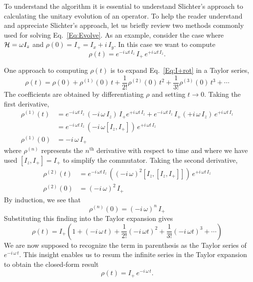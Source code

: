 To understand the  algorithm it is essential to understand Slichter's approach to calculating the unitary evolution of an operator.  To help the reader understand and appreciate Slichter's approach, let us briefly review two methods commonly used for solving Eq.~\ref{Eq:Evolve}.  As an example, consider the case where ${\cal H} = \omega I_z$ and $\rho(0) = I_{+} = I_x + i \, I_y$.  In this case we want to compute
\begin{equation}
\rho(t) 
	= e^{-i \, \omega t \, I_z} \, I_{+} \, e^{+i \, \omega t \, I_z}.
	\label{Eq:I+rot}
\end{equation}

  One approach to computing $\rho(t)$ is to expand Eq.~\ref{Eq:I+rot} in a Taylor series,
\begin{equation}
\rho(t) 
	= \rho(0) + \rho^{(1)}(0) \, t + \frac{1}{2!} \rho^{(2)}(0) \, t^2
 		+ \frac{1}{3!} \rho^{(3)}(0) \, t^3 + \cdots
\end{equation}
The coefficients are obtained by differentiating $\rho$ and setting $t \rightarrow 0$.  Taking the first derivative,
\begin{subequations}
\begin{align}
\rho^{(1)}(t) 
	& = e^{-i \, \omega t \, I_z} \,
		(-i \, \omega \, I_z) \, I_{+} 
		e^{+i \, \omega t \, I_z}
	 + e^{-i \, \omega t \, I_z} \,
		 I_{+} (+i \, \omega \, I_z) \, 
		e^{+i \, \omega t \, I_z} \\
	& = e^{-i \, \omega t \, I_z} \, 
		(-i \, \omega [I_z,I_{+}] ) 
		\, e^{+i \, \omega t \, I_z} \\
\rho^{(1)}(0) & = -i \, \omega \, I_{+}
\end{align}
\end{subequations}
where $\rho^{(n)}$ represents the $n^{\text{th}}$ derivative with respect to time and where we have used $[I_z,I_{+}] = I_{+}$ to simplify the commutator.  Taking the second derivative,
\begin{subequations}
\begin{align}
\rho^{(2)}(t) & = e^{-i \, \omega t \, I_z} \, 
	((-i \, \omega)^2 [I_z,[I_z,I_{+}]] ) 
	\, e^{+i \, \omega t \, I_z} \\
\rho^{(2)}(0) & = (-i \, \omega)^2 \, I_{+} 
\end{align}
\end{subequations}
By induction, we see that
\begin{equation}
\rho^{(n)}(0) = (-i \, \omega)^n \, I_{+}
\end{equation}
Substituting this finding into the Taylor expansion gives
\begin{equation}
\rho(t) 
	= I_{+} \left( 1 
		+ (-i \, \omega \, t) 
		+ \frac{1}{2!} (-i \, \omega t)^2 
		+ \frac{1}{3!} (-i \, \omega t)^3
		+ \cdots
	\right)
\end{equation}
We are now supposed to recognize the term in parenthesis as the Taylor series of $e^{-i \, \omega \, t}$.  This insight enables us to resum the infinite series in the Taylor expansion to obtain the closed-form result
\begin{equation}
\rho(t) 
	= I_{+} \, e^{-i \, \omega \, t}.
	\label{Eq:I+-soln-method-1}
\end{equation}   


